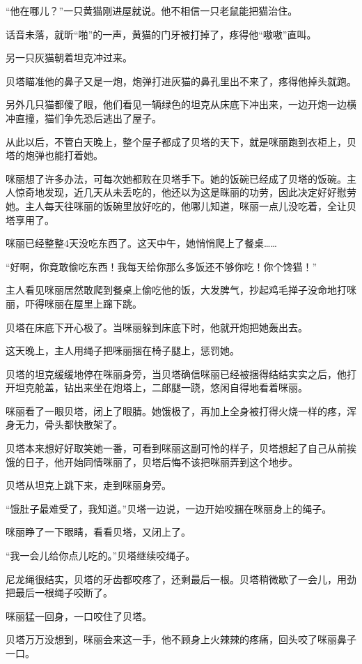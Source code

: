 \documentclass[a4paper,12pt,UTF8,twoside]{ctexbook}
\begin{document}
“他在哪儿？”一只黄猫刚进屋就说。他不相信一只老鼠能把猫治住。

话音未落，就昕“啪”的一声，黄猫的门牙被打掉了，疼得他“嗷嗷”直叫。

另一只灰猫朝着坦克冲过来。

贝塔瞄准他的鼻子又是一炮，炮弹打进灰猫的鼻孔里出不来了，疼得他掉头就跑。

另外几只猫都傻了眼，他们看见一辆绿色的坦克从床底下冲出来，一边开炮一边横冲直撞，猫们争先恐后逃出了屋子。

从此以后，不管白天晚上，整个屋子都成了贝塔的天下，就是咪丽跑到衣柜上，贝塔的炮弹也能打着她。

咪丽想了许多办法，可每次她都败在贝塔手下。她的饭碗已经成了贝塔的饭碗。主人惊奇地发现，近几天从未丢吃的，他还以为这是眯丽的功劳，因此决定好好慰劳她。主人每天往咪丽的饭碗里放好吃的，他哪儿知道，咪丽一点儿没吃着，全让贝塔享用了。

咪丽已经整整4天没吃东西了。这天中午，她悄悄爬上了餐桌……

“好啊，你竟敢偷吃东西！我每天给你那么多饭还不够你吃！你个馋猫！”

主人看见咪丽居然敢爬到餐桌上偷吃他的饭，大发脾气，抄起鸡毛掸子没命地打咪丽，吓得咪丽在屋里上蹿下跳。

贝塔在床底下开心极了。当咪丽躲到床底下时，他就开炮把她轰出去。

这天晚上，主人用绳子把咪丽捆在椅子腿上，惩罚她。

贝塔的坦克缓缓地停在咪丽身旁，当贝塔确信咪丽已经被捆得结结实实之后，他打开坦克舱盖，钻出来坐在炮塔上，二郎腿一跷，悠闲自得地看着咪丽。

咪丽看了一眼贝塔，闭上了眼腈。她饿极了，再加上全身被打得火烧一样的疼，浑身无力，骨头都快散架了。

贝塔本来想好好取笑她一番，可看到咪丽这副可怜的样子，贝塔想起了自己从前挨饿的日子，他开始同情咪丽了，贝塔后悔不该把咪丽弄到这个地步。

贝塔从坦克上跳下来，走到咪丽身旁。

“饿肚子最难受了，我知道。”贝塔一边说，一边开始咬捆在咪丽身上的绳子。

咪丽睁了一下眼睛，看看贝塔，又闭上了。

“我一会儿给你点儿吃的。”贝塔继续咬绳子。

尼龙绳很结实，贝塔的牙齿都咬疼了，还剩最后一根。贝塔稍微歇了一会儿，用劲把最后一根绳子咬断了。

咪丽猛一回身，一口咬住了贝塔。

贝塔万万没想到，咪丽会来这一手，他不顾身上火辣辣的疼痛，回头咬了咪丽鼻子一口。
\end{document}
